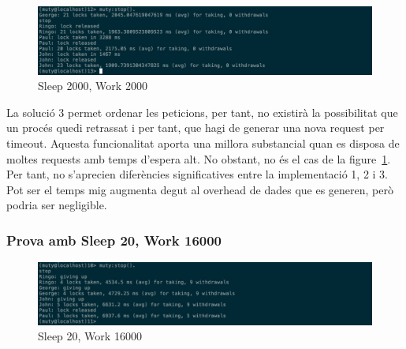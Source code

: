 \documentclass[a4paper, 11pt]{article}
\begin{document}
\begin{figure}[H]
    \centering
    \includegraphics[width=1.0\textwidth]{figures/2000-2000lock3}
    \caption{Sleep 2000, Work 2000 \label{fig:2000-2000lock3}}    
\end{figure}

La solució 3 permet ordenar les peticions, per tant, no existirà la possibilitat que un procés quedi retrassat i per tant, que hagi de generar una nova request per timeout. 
Aquesta funcionalitat aporta una millora substancial quan es disposa de moltes requests amb temps d'espera alt. No obstant, no és el cas de la figure~\ref{fig:2000-2000lock3}. Per tant, no s'aprecien diferències significatives entre la implementació 1, 2 i 3. Pot ser el temps mig augmenta degut al overhead de dades que es generen, però podria ser negligible. 

\subsubsection{Prova amb Sleep 20, Work 16000}

\begin{figure}[H]
    \centering
    \includegraphics[width=1.0\textwidth]{figures/20-16000lock3}
    \caption{Sleep 20, Work 16000 \label{fig:20-16000lock3}}    
\end{figure}
\end{document}
